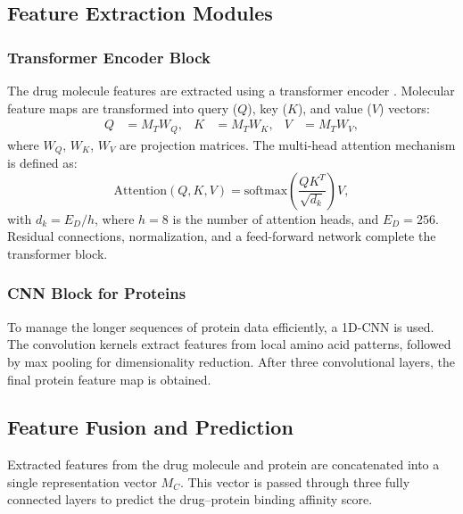\documentclass{article}
\begin{document}
\subsection{Feature Extraction Modules}
\subsubsection{Transformer Encoder Block}
The drug molecule features are extracted using a transformer encoder \cite{vaswani2017attention}. Molecular feature maps are transformed into query ($Q$), key ($K$), and value ($V$) vectors:
\begin{align}
	Q &= M_T W_Q, & K &= M_T W_K, & V &= M_T W_V,
\end{align}
where $W_Q$, $W_K$, $W_V$ are projection matrices. The multi-head attention mechanism is defined as:
\begin{equation}
	\text{Attention}(Q, K, V) = \text{softmax}\left(\frac{QK^T}{\sqrt{d_k}}\right)V,
\end{equation}
with $d_k = E_D / h$, where $h=8$ is the number of attention heads, and $E_D=256$. Residual connections, normalization, and a feed-forward network complete the transformer block.

\subsubsection{CNN Block for Proteins}
To manage the longer sequences of protein data efficiently, a 1D-CNN is used. The convolution kernels extract features from local amino acid patterns, followed by max pooling for dimensionality reduction. After three convolutional layers, the final protein feature map is obtained.

\subsection{Feature Fusion and Prediction}
Extracted features from the drug molecule and protein are concatenated into a single representation vector $M_C$. This vector is passed through three fully connected layers to predict the drug–protein binding affinity score.
\end{document}
